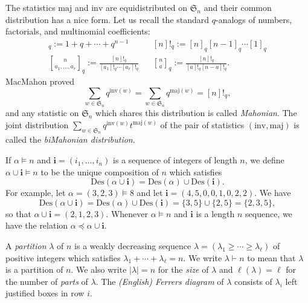 \documentclass[ALCO,ThmDefs,published]{cedram}
\newcommand{\symm}{{\mathfrak{S}}}
\theoremstyle{plain}
\newcommand{\maj}{{\mathrm {maj}}}
\newcommand{\inv}{{\mathrm {inv}}}
\newcommand{\Des}{{\mathrm {Des}}}
\newcommand{\symm}{{\mathfrak{S}}}
\newcommand{\ii}{{\mathbf{i}}}
\begin{document}
The statistics $\maj$ and $\inv$ are equidistributed on $\symm_n$ and their common distribution has
a nice form.    Let us recall the standard $q$-analogs of numbers, factorials, and multinomial coefficients:
\begin{align*}
[n]_q := 1 + q + \cdots + q^{n-1} &   &[n]!_q := [n]_q [n-1]_q \cdots [1]_q  \\
{n \brack a_1, \dots , a_r}_q := \frac{[n]!_q}{[a_1]!_q \cdots [a_r]!_q} 
& &{n \brack a}_q := \frac{[n]!_q}{[a]!_q [n-a]!_q}.
\end{align*}
MacMahon \cite{MacMahon} proved  
\begin{equation}
\sum_{w \in \symm_n} q^{\inv(w)} = \sum_{w \in \symm_n} q^{\maj(w)} = [n]!_q,
\end{equation}
and any statistic on $\symm_n$ which shares this distribution is called \emph{Mahonian}.
The joint distribution $\sum_{w \in \symm_n} q^{\inv(w)} t^{\maj(w)}$ of the pair of statistics
$(\inv, \maj)$ is called the \emph{biMahonian distribution}.




If $\alpha \models n$ and $\ii = (i_1, \dots, i_n)$ 
is a sequence of  integers of length $n$, we define $\alpha \cup \ii \models n$ 
to be the unique composition of $n$ which satisfies
\begin{equation}
\Des(\alpha \cup \ii) = \Des(\alpha) \cup \Des(\ii).
\end{equation}
For example, let $\alpha = (3,2,3) \models 8$ and let
$\ii = (4,5,0,0,1,0,2,2)$.  We have 
\begin{equation*}
\Des(\alpha \cup \ii) = \Des(\alpha) \cup \Des(\ii) = \{3,5\} \cup \{2,5\} = \{2,3,5\},
\end{equation*}
so that $\alpha \cup \ii = (2,1,2,3)$.
Whenever $\alpha \models n$ and $\ii$ is a length $n$ sequence, we have the 
relation $\alpha \preceq \alpha \cup \ii$.



A \emph{partition} $\lambda$ of $n$ is a weakly decreasing sequence $\lambda = (\lambda_1 \geq \cdots \geq \lambda_{\ell})$
of positive integers
which satisfies $\lambda_1 + \cdots + \lambda_{\ell} = n$.  We write
$\lambda \vdash n$ to mean that $\lambda$ is a partition of $n$.  We also write
$|\lambda| = n$ for the \emph{size} of $\lambda$ and $\ell(\lambda) = \ell$ for the number of \emph{parts}
of $\lambda$.
The \emph{(English) Ferrers diagram}
of $\lambda$ consists of $\lambda_i$ left justified boxes in row $i$.
\end{document}
